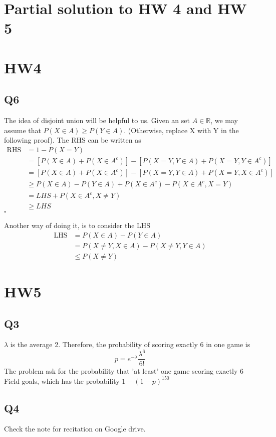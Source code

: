 \documentclass[12pt]{article}
\begin{document}
\section*{Partial solution to HW 4 and HW 5}
\section*{HW4}
\subsection*{Q6}
The idea of disjoint union will be helpful to us.
Given an set \(A\in \mathbb{R}\), we may assume that \(P(X \in A) \geq  P(Y \in A)\). (Otherwise, replace X with Y in the following proof).  
The RHS can be written as
\begin{equation*}
\begin{aligned}
    \text{RHS} &=  1 - P(X = Y ) \\
             &= [ P(X \in A) + P(X \in A^c) ] - [P(X = Y, Y \in A) + P(X = Y, Y \in A^c)]\\
             &= [ P(X \in A) + P(X \in A^c) ] - [P(X = Y, Y \in A) + P(X = Y, X \in A^c)]\\
             & \geq P(X\in A) - P(Y \in A) + P(X\in A^c) - P(X\in A^c, X = Y) \\
             & = LHS + P(X\in A^c, X \neq Y) \\ 
             & \geq LHS 
\end{aligned}
\end{equation*}
\hspace{\textwidth}$\square$   

Another way of doing it, is to consider the LHS
\begin{equation}
    \begin{aligned}
        \text{LHS} &= P(X \in A) - P(Y \in A) \\
                & = P(X \neq Y, X\in A) - P(X \neq Y, Y\in A)\\
                & \leq P(X \neq Y) 
    \end{aligned}
\end{equation}

\section*{HW5}
\subsection*{Q3}
\(\lambda \) is the average 2. 
Therefore, the probability of scoring exactly 6 in one game is 
\[
   p =   e^{-\lambda} \frac{\lambda^6}{6!}
\] 
The problem ask for the probability that 'at least' one game scoring exactly 6 Field goals, which has the probability
\(1- (1-p)^{150}\) 
\subsection*{Q4}
Check the note for recitation on Google drive. 
\end{document}
